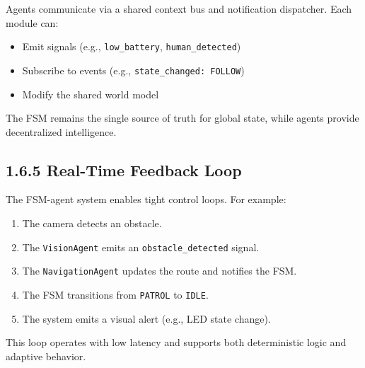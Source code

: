 Agents communicate via a shared context bus and notification dispatcher. Each module can:

\begin{itemize}
    \item Emit signals (e.g., \texttt{low\_battery}, \texttt{human\_detected})
    \item Subscribe to events (e.g., \texttt{state\_changed: FOLLOW})
    \item Modify the shared world model
\end{itemize}

The FSM remains the single source of truth for global state, while agents provide decentralized intelligence.

\vspace{0.5cm}

\subsection*{1.6.5 Real-Time Feedback Loop}

The FSM-agent system enables tight control loops. For example:

\begin{enumerate}
    \item The camera detects an obstacle.
    \item The \texttt{VisionAgent} emits an \texttt{obstacle\_detected} signal.
    \item The \texttt{NavigationAgent} updates the route and notifies the FSM.
    \item The FSM transitions from \texttt{PATROL} to \texttt{IDLE}.
    \item The system emits a visual alert (e.g., LED state change).
\end{enumerate}

This loop operates with low latency and supports both deterministic logic and adaptive behavior.
